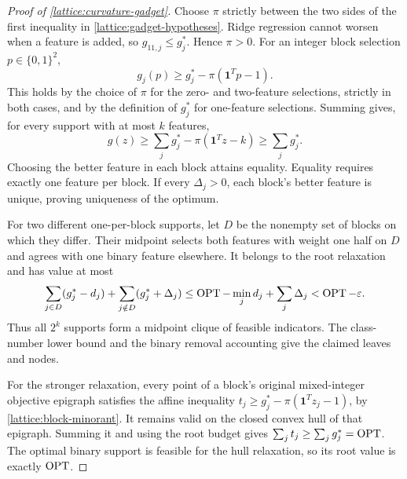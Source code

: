 \begin{proof}[Proof of \cref{lattice:curvature-gadget}]
Choose $\pi$ strictly between the two sides of the first inequality in
\eqref{lattice:gadget-hypotheses}. Ridge regression cannot worsen when a
feature is added, so $g_{11,j}\le g_j^*$. Hence $\pi>0$. For an integer
block selection $p\in\{0,1\}^2$,
\begin{equation}
 g_j(p)\ge g_j^*-\pi(\mathbf1^Tp-1).
 \label{lattice:block-minorant}
\end{equation}
This holds by the choice of $\pi$ for the zero- and two-feature
selections, strictly in both cases, and by the definition of $g_j^*$ for
one-feature selections. Summing gives, for every support with at most $k$
features,
\begin{equation*}
 g(z)\ge\sum_jg_j^*-\pi(\mathbf1^Tz-k)\ge\sum_jg_j^*.
\end{equation*}
Choosing the better feature in each block attains equality. Equality
requires exactly one feature per block. If every $\Delta_j>0$, each
block's better feature is unique, proving uniqueness of the optimum.

For two different one-per-block supports, let $D$ be the nonempty set of
blocks on which they differ. Their midpoint selects both features with
weight one half on $D$ and agrees with one binary feature elsewhere. It
belongs to the root relaxation and has value at most
\begin{equation*}
 \sum_{j\in D}(g_j^*-d_j)
 +\sum_{j\notin D}(g_j^*+\Delta_j)
 \le\operatorname{OPT}-\min_jd_j+\sum_j\Delta_j
 <\operatorname{OPT}-\varepsilon.
\end{equation*}
Thus all $2^k$ supports form a midpoint clique of feasible indicators.
The class-number lower bound and the binary removal accounting give the
claimed leaves and nodes.

For the stronger relaxation, every point of a block's original
mixed-integer objective epigraph satisfies the affine inequality
$t_j\ge g_j^*-\pi(\mathbf1^Tz_j-1)$, by
\eqref{lattice:block-minorant}. It remains valid on the closed convex
hull of that epigraph. Summing it and using the root budget gives
$\sum_jt_j\ge\sum_jg_j^*=\operatorname{OPT}$. The optimal binary support is feasible
for the hull relaxation, so its root value is exactly $\operatorname{OPT}$.


\end{proof}
